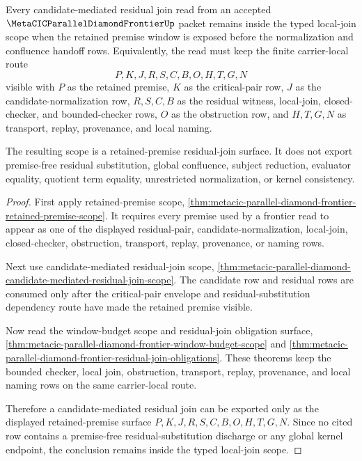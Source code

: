 \begin{theorem}
\label{thm:metacic-parallel-diamond-retained-premise-residual-join-scope}
Every candidate-mediated residual join read from an accepted $\MetaCICParallelDiamondFrontierUp$ packet remains inside the typed local-join scope when the retained premise window is exposed before the normalization and confluence handoff rows. Equivalently, the read must keep the finite carrier-local route
$$
P,K,J,R,S,C,B,O,H,T,G,N
$$
visible with $P$ as the retained premise, $K$ as the critical-pair row, $J$ as the candidate-normalization row, $R,S,C,B$ as the residual witness, local-join, closed-checker, and bounded-checker rows, $O$ as the obstruction row, and $H,T,G,N$ as transport, replay, provenance, and local naming.

The resulting scope is a retained-premise residual-join surface. It does not export premise-free residual substitution, global confluence, subject reduction, evaluator equality, quotient term equality, unrestricted normalization, or kernel consistency.
\end{theorem}
\begin{proof}
First apply retained-premise scope, \autoref{thm:metacic-parallel-diamond-frontier-retained-premise-scope}. It requires every premise used by a frontier read to appear as one of the displayed residual-pair, candidate-normalization, local-join, closed-checker, obstruction, transport, replay, provenance, or naming rows.

Next use candidate-mediated residual-join scope, \autoref{thm:metacic-parallel-diamond-candidate-mediated-residual-join-scope}. The candidate row and residual rows are consumed only after the critical-pair envelope and residual-substitution dependency route have made the retained premise visible.

Now read the window-budget scope and residual-join obligation surface, \autoref{thm:metacic-parallel-diamond-frontier-window-budget-scope} and \autoref{thm:metacic-parallel-diamond-frontier-residual-join-obligations}. These theorems keep the bounded checker, local join, obstruction, transport, replay, provenance, and local naming rows on the same carrier-local route.

Therefore a candidate-mediated residual join can be exported only as the displayed retained-premise surface $P,K,J,R,S,C,B,O,H,T,G,N$. Since no cited row contains a premise-free residual-substitution discharge or any global kernel endpoint, the conclusion remains inside the typed local-join scope.
\end{proof}
